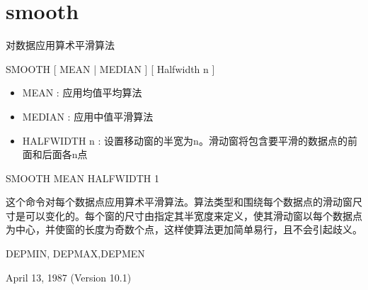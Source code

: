 \section{smooth}
\label{cmd:smooth}

对数据应用算术平滑算法

SMOOTH [ MEAN | MEDIAN ] [ Halfwidth n ]

\begin{itemize}
\item MEAN : 应用均值平均算法 
\item MEDIAN : 应用中值平滑算法 
\item HALFWIDTH n : 设置移动窗的半宽为n。滑动窗将包含要平滑的数据点的前面和后面各n点 
\end{itemize}

SMOOTH MEAN HALFWIDTH 1

这个命令对每个数据点应用算术平滑算法。算法类型和围绕每个数据点的滑动窗尺寸是可以变化的。每个窗的尺寸由指定其半宽度来定义，使其滑动窗以每个数据点为中心，并使窗的长度为奇数个点，这样使算法更加简单易行，且不会引起歧义。

DEPMIN, DEPMAX,DEPMEN

April 13, 1987 (Version 10.1)
